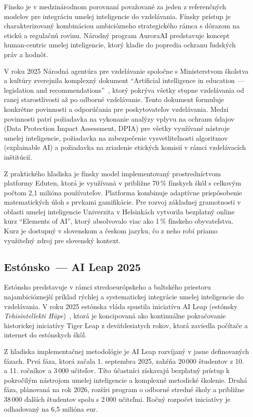 Fínsko je v medzinárodnom porovnaní považované za jeden z referenčných modelov pre integráciu umelej inteligencie do vzdelávania. Fínsky prístup je charakterizovaný kombináciou ambiciózneho strategického rámca s dôrazom na etickú a regulačnú rovinu. Národný program AuroraAI predstavuje koncept human-centric umelej inteligencie, ktorý kladie do popredia ochranu ľudských práv a hodnôt.

V roku 2025 Národná agentúra pre vzdelávanie spoločne s Ministerstvom školstva a kultúry zverejnila komplexný dokument \enquote{Artificial intelligence in education~--- legislation and recommendations}~\cite{finland2025aieducation}, ktorý pokrýva všetky stupne vzdelávania od ranej starostlivosti až po odborné vzdelávanie. Tento dokument formuluje konkrétne povinnosti a odporúčania pre poskytovateľov vzdelávania. Medzi povinnosti patrí požiadavka na vykonanie analýzy vplyvu na ochranu údajov (Data Protection Impact Assessment, DPIA) pre všetky využívané nástroje umelej inteligencie, požiadavka na zabezpečenie vysvetliteľnosti algoritmov (explainable AI) a požiadavka na zriadenie etických komisií v rámci vzdelávacích inštitúcií.

Z praktického hľadiska je fínsky model implementovaný prostredníctvom platformy Eduten, ktorá je využívaná v približne 70\,\% fínskych škôl s celkovým počtom 2,1 milióna používateľov. Platforma kombinuje adaptívne prispôsobenie matematických úloh s prvkami gamifikácie. Pre rozvoj základnej gramotnosti v oblasti umelej inteligencie Univerzita v Helsinkách vytvorila bezplatný online kurz \enquote{Elements of AI}, ktorý absolvovalo viac ako 1\,\% fínskeho obyvateľstva. Kurz je dostupný v slovenskom a českom jazyku, čo z neho robí priamo využiteľný zdroj pre slovenský kontext.


\subsection{Estónsko~--- AI Leap 2025}

Estónsko predstavuje v rámci stredoeurópskeho a baltského priestoru najambicióznejší príklad rýchlej a systematickej integrácie umelej inteligencie do vzdelávania. V roku 2025 estónska vláda spustila iniciatívu AI Leap (estónsky \textit{Tehisintellekti Hüpe})~\cite{estonia2025aileap}, ktorá je koncipovaná ako kontinuálne pokračovanie historickej iniciatívy Tiger Leap z deväťdesiatych rokov, ktorá zaviedla počítače a internet do estónskych škôl.

Z hľadiska implementačnej metodológie je AI Leap rozvíjaný v jasne definovaných fázach. Prvá fáza, ktorá začala 1. septembra 2025, zahŕňa 20\,000 študentov z 10. a 11. ročníkov a 3\,000 učiteľov. Títo účastníci získavajú bezplatný prístup k pokročilým nástrojom umelej inteligencie a komplexné metodické školenie. Druhá fáza, plánovaná na rok 2026, rozšíri program o odborné stredné školy a približne 38\,000 ďalších študentov spolu s 2\,000 učiteľmi. Ročný rozpočet iniciatívy je odhadovaný na 6,5 milióna eur.

